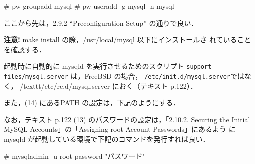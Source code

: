 \begin{cli}
# pw groupadd mysql
# pw useradd -g mysql -n mysql
\end{cli}

ここから先は，2.9.2 ``Preconfiguration Setup'' の通りで良い．

\textbf{注意!} make install の際，/usr/local/mysql 以下にインストールさ
れていることを確認する．

起動時に自動的に mysqld を実行させるためのスクリプト
\texttt{support-files/mysql.server} は，FreeBSD の場合，
\texttt{/etc/init.d/mysql.server}ではなく，
/texttt{/etc/rc.d/mysql.server} におく（テキスト p.122）．

また，(14) にあるPATH の設定は，下記のようにする．
なお，テキスト p.122 (13) のパスワードの設定は，「2.10.2. Securing the
Initial MySQL Accounts」の「Assigning root Account Passwords」にあるよう
に mysqld が起動している環境で下記のコマンドを発行すれば良い．

\begin{cli}
# mysqladmin -u root password "パスワード"
\end{cli}
